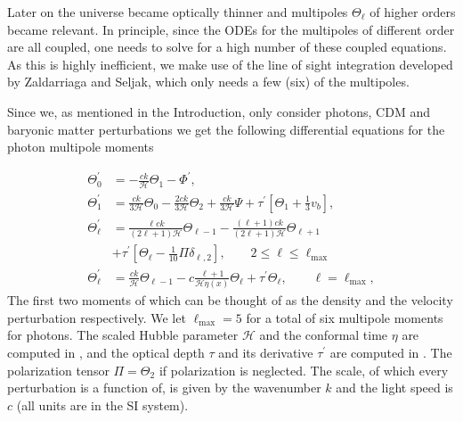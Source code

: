 \documentclass[twocolumn]{aastex62}
\begin{document}
Later on the universe became optically thinner and multipoles $\Theta_\ell$ of higher orders became relevant. In principle, since the ODEs for the multipoles of different order are all coupled, one needs to solve for a high number of these coupled equations. As this is highly inefficient, we make use of the line of sight integration developed by Zaldarriaga and Seljak, which only needs a few (six) of the multipoles. 

Since we, as mentioned in the Introduction, only consider photons, CDM and baryonic matter perturbations we get the following differential equations for the photon multipole moments

\begin{align}
    \Theta^\prime_0 &= -\frac{ck}{\mathcal{H}} \Theta_1 - \Phi^\prime, \\
    \Theta^\prime_1 &=  \frac{ck}{3\mathcal{H}} \Theta_0 - \frac{2ck}{3\mathcal{H}}\Theta_2 +
    \frac{ck}{3\mathcal{H}}\Psi + \tau^\prime\left[\Theta_1 + \frac{1}{3}v_b\right], \\
    \Theta^\prime_\ell &= \frac{\ell ck}{(2\ell+1)\mathcal{H}}\Theta_{\ell-1} - \frac{(\ell+1)ck}{(2\ell+1)\mathcal{H}}
    \Theta_{\ell+1} \nonumber \\
    &+ \tau^\prime\left[\Theta_\ell - \frac{1}{10}\Pi
    \delta_{\ell,2}\right], \qquad  2 \le \ell \leq \ell_{\textrm{max}} \\
    \Theta_{\ell}^\prime &= \frac{ck}{\mathcal{H}}
    \Theta_{\ell-1}-c\frac{\ell+1}{\mathcal{H}\eta(x)}\Theta_\ell+\tau^\prime\Theta_\ell,
    \quad\quad \ell = \ell_{\textrm{max}},
\end{align}
The first two moments of which can be thought of as the density and the velocity perturbation respectively. We let $\ell_\mathrm{max} = 5$ for a total of six multipole moments for photons. The scaled Hubble parameter $\mathcal{H}$ and the conformal time $\eta$ are computed in \cite{stutzer:2020a}, and the optical depth $\tau$ and its derivative $\tau^\prime$ are computed in \cite{stutzer:2020b}. The polarization tensor $\Pi = \Theta_2$ if polarization is neglected. The scale, of which every perturbation is a function of, is given by the wavenumber $k$ and the light speed is $c$ (all units are in the SI system). 
\end{document}
